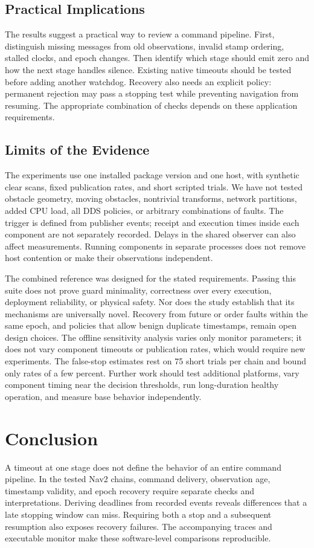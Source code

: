 \documentclass[conference]{IEEEtran}
\begin{document}
\subsection{Practical Implications}
The results suggest a practical way to review a command pipeline. First, distinguish missing messages from old observations, invalid stamp ordering, stalled clocks, and epoch changes. Then identify which stage should emit zero and how the next stage handles silence. Existing native timeouts should be tested before adding another watchdog. Recovery also needs an explicit policy: permanent rejection may pass a stopping test while preventing navigation from resuming. The appropriate combination of checks depends on these application requirements.

\subsection{Limits of the Evidence}
The experiments use one installed package version and one host, with synthetic clear scans, fixed publication rates, and short scripted trials. We have not tested obstacle geometry, moving obstacles, nontrivial transforms, network partitions, added CPU load, all DDS policies, or arbitrary combinations of faults. The trigger is defined from publisher events; receipt and execution times inside each component are not separately recorded. Delays in the shared observer can also affect measurements. Running components in separate processes does not remove host contention or make their observations independent.

The combined reference was designed for the stated requirements. Passing this suite does not prove guard minimality, correctness over every execution, deployment reliability, or physical safety. Nor does the study establish that its mechanisms are universally novel. Recovery from future or order faults within the same epoch, and policies that allow benign duplicate timestamps, remain open design choices. The offline sensitivity analysis varies only monitor parameters; it does not vary component timeouts or publication rates, which would require new experiments. The false-stop estimates rest on 75 short trials per chain and bound only rates of a few percent. Further work should test additional platforms, vary component timing near the decision thresholds, run long-duration healthy operation, and measure base behavior independently.

\section{Conclusion}
A timeout at one stage does not define the behavior of an entire command pipeline. In the tested Nav2 chains, command delivery, observation age, timestamp validity, and epoch recovery require separate checks and interpretations. Deriving deadlines from recorded events reveals differences that a late stopping window can miss. Requiring both a stop and a subsequent resumption also exposes recovery failures. The accompanying traces and executable monitor make these software-level comparisons reproducible.
\end{document}

